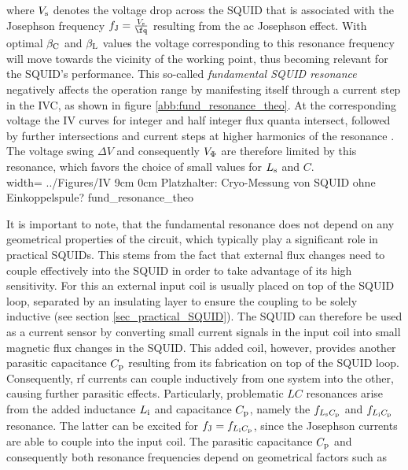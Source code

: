 where $V_{\rm s}$ denotes the voltage drop across the SQUID that is associated with the Josephson frequency $f_{\rm J}=\frac{V_{\rm s}}{\unit{\fq}}$ resulting from the ac Josephson effect. With optimal $\beta_{\rm C}$ and $\beta_{\rm L}$ values the voltage corresponding to this resonance frequency will move towards the vicinity of the working point, thus becoming relevant for the SQUID's performance.
This so-called \textit{fundamental SQUID resonance} negatively affects the operation range by manifesting itself through a current step in the IVC, as shown in figure \ref{abb:fund_resonance_theo}. At the corresponding voltage the IV curves for integer and half integer flux quanta intersect, followed by further intersections and current steps at higher harmonics of the resonance \cite{Clarke2004}. The voltage swing $\Delta V$ and consequently $V_{\rm \Phi}$ are therefore limited by this resonance, which favors the choice of small values for $L_{\rm s}$ and $C$. \\

{width=\textwidth}
{../Figures/IV}
{9cm}
{0cm}
{Platzhalter: Cryo-Messung von SQUID ohne Einkoppelspule?} 
{fund_resonance_theo}

It is important to note, that the fundamental resonance does not depend on any geometrical properties of the circuit, which typically play a significant role in practical SQUIDs. This stems from the fact that external flux changes need to couple effectively into the SQUID in order to take advantage of its high sensitivity. For this an external input coil is usually placed on top of the SQUID loop, separated by an insulating layer to ensure the coupling to be solely inductive (see section \ref{sec_practical_SQUID}). The SQUID can therefore be used as a current sensor by converting small current signals in the input coil into small magnetic flux changes in the SQUID. This added coil, however, provides another parasitic capacitance $C_{\rm p}$ resulting from its fabrication on top of the SQUID loop. Consequently, rf currents can couple inductively from one system into the other, causing further parasitic effects. Particularly, problematic $LC$ resonances arise from the added inductance $L_{\rm i}$ and capacitance $C_{\rm p}$, namely the $f_{L_{\rm s}C_{\rm p}}$ and $f_{L_{\rm i}C_{\rm p}}$ resonance. The latter can be excited for $f_{\rm J}=f_{L_{\rm i}C_{\rm p}}$, since the Josephson currents are able to couple into the input coil. The parasitic capacitance $C_{\rm p}$ and consequently both resonance frequencies depend on geometrical factors such as 
